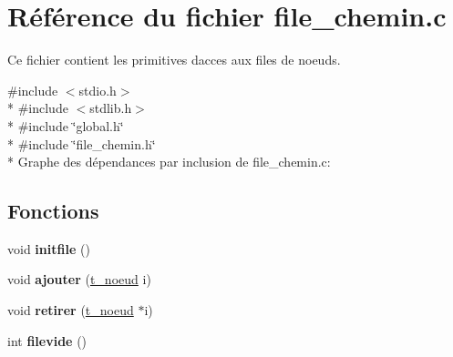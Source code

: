\hypertarget{a00014}{}\section{Référence du fichier file\+\_\+chemin.\+c}
\label{a00014}


Ce fichier contient les primitives d\textquotesingle{}acces aux files de noeuds.  


{\ttfamily \#include $<$stdio.\+h$>$}\\*
{\ttfamily \#include $<$stdlib.\+h$>$}\\*
{\ttfamily \#include \char`\"{}global.\+h\char`\"{}}\\*
{\ttfamily \#include \char`\"{}file\+\_\+chemin.\+h\char`\"{}}\\*
Graphe des dépendances par inclusion de file\+\_\+chemin.\+c\+:
\subsection*{Fonctions}
\begin{DoxyCompactItemize}
\item 
void {\bfseries initfile} ()\hypertarget{a00014_aaf4be56c084d19f107f0da19c7c17216}{}\label{a00014_aaf4be56c084d19f107f0da19c7c17216}

\item 
void {\bfseries ajouter} (\hyperlink{a00007}{t\+\_\+noeud} i)\hypertarget{a00014_a102c68ec4d3006b943c1e63ad7bcd563}{}\label{a00014_a102c68ec4d3006b943c1e63ad7bcd563}

\item 
void {\bfseries retirer} (\hyperlink{a00007}{t\+\_\+noeud} $\ast$i)\hypertarget{a00014_a04ee1626a03e6867490802212829ccc5}{}\label{a00014_a04ee1626a03e6867490802212829ccc5}

\item 
int {\bfseries filevide} ()\hypertarget{a00014_a1dfabfa7163dc55b1cfa0f9317ee5bc8}{}\label{a00014_a1dfabfa7163dc55b1cfa0f9317ee5bc8}

\end{DoxyCompactItemize}
